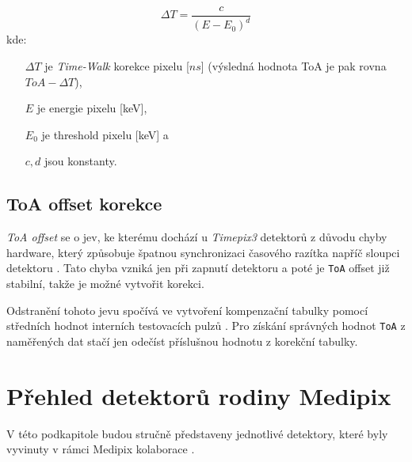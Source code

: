 \begin{equation}\label{eq:det:timeWalk}
	\Delta T = \frac{c}{(E - E_0)^d}
\end{equation}
kde:
\begin{changemargin}{1.5cm}{1cm} 
	\begin{itemize}
		\item [$\Delta T$] je \textit{Time-Walk} korekce pixelu [$ns$] (výsledná hodnota ToA je pak rovna $ToA-\Delta T$),
		\item [$E$] je energie pixelu [keV],
		\item [$E_0$] je threshold pixelu [keV] a
		\item [$c,d$] jsou konstanty.
	\end{itemize}
\end{changemargin}

\subsection{ToA offset korekce}\label{chap:detectors:calibration:toa_correction}
\textit{ToA offset} se o jev, ke kterému dochází u \textit{Timepix3} detektorů z důvodu chyby hardware, který způsobuje špatnou synchronizaci časového razítka napříč sloupci detektoru \cite{Katherine}. Tato chyba vzniká jen při zapnutí detektoru a poté je \texttt{ToA} offset již stabilní, takže je možné vytvořit korekci.

Odstranění tohoto jevu spočívá ve vytvoření kompenzační tabulky pomocí středních hodnot interních testovacích pulzů \cite{timepix3}. Pro získání správných hodnot \texttt{ToA} z naměřených dat stačí jen odečíst příslušnou hodnotu z korekční tabulky.

\section{Přehled detektorů rodiny Medipix}\label{chap:detectors:medipix_overview}
V této podkapitole budou stručně představeny jednotlivé detektory, které byly vyvinuty v rámci Medipix kolaborace \cite{medipix-www}.

